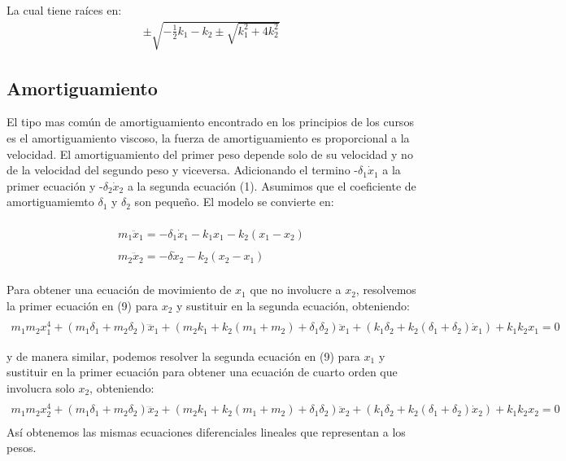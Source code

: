 \documentclass{article}
\begin{document}
La cual tiene raíces en:
\begin{equation}
\begin{aligned}
\pm\sqrt{-\frac{1}{2}k_1-k_2\pm\sqrt{k_1^2+4k_2^2}}
\end{aligned}
\end{equation}

\subsection{Amortiguamiento}
El tipo mas común de amortiguamiento encontrado en los principios de los cursos es el amortiguamiento viscoso, la fuerza de amortiguamiento es proporcional a la velocidad.
\newline
El amortiguamiento del primer peso depende solo de su velocidad y no de la velocidad del segundo peso y viceversa. Adicionando el termino -$\delta_1\dot x_1$ a la primer ecuación y -$\delta_2\dot x_2$ a la segunda ecuación (1). Asumimos que el coeficiente de amortiguamiemto $\delta_1$ y $\delta_2$ son pequeño. El modelo se convierte en:

\begin{equation}
\begin{aligned}
\\m_1\ddot x_1= -\delta_1\dot x_1-k_1x_1-k_2(x_1-x_2)\\
\\m_2\ddot x_2= -\delta\dot x_2-k_2(x_2-x_1)\\
\end{aligned}
\end{equation}

Para obtener una ecuación de movimiento de $x_1$ que no involucre a $x_2$, resolvemos la primer ecuación en (9) para $x_2$ y sustituir en la segunda ecuación, obteniendo:
\begin{equation}
\begin{aligned}
\\m_1m_2x_1^{4}+(m_1\delta _1+ m_2\delta _2)\dddot x_1+(m_2k_1+k_2(m_1+m_2)+\delta_1\delta_2)\ddot x_1+(k_1\delta_2+k_2(\delta_1+\delta_2)\dot x_1)+k_1k_2x_1=0
\end{aligned}
\end{equation}

y de manera similar, podemos resolver la segunda ecuación en (9) para $x_1$ y sustituir en la primer ecuación para obtener una ecuación de cuarto orden que involucra solo $x_2$, obteniendo:
\begin{equation}
\begin{aligned}
\\m_1m_2x_2^{4}+(m_1\delta _1+ m_2\delta _2)\dddot x_2+(m_2k_1+k_2(m_1+m_2)+\delta_1\delta_2)\ddot x_2+(k_1\delta_2+k_2(\delta_1+\delta_2)\dot x_2)+k_1k_2x_2=0\\
\end{aligned}
\end{equation}
Así obtenemos las mismas ecuaciones diferenciales lineales que representan a los pesos.
\end{document}
